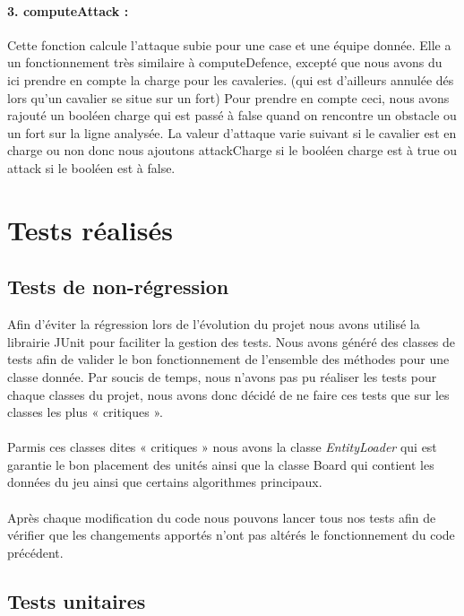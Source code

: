 			\paragraph{3. computeAttack : }
			Cette fonction calcule l'attaque subie pour une case et une équipe donnée.
			Elle a un fonctionnement très similaire à computeDefence, excepté que nous avons du ici prendre en compte la charge pour les cavaleries. 
			(qui est d'ailleurs annulée dés lors qu'un cavalier se situe sur un fort)
			Pour prendre en compte ceci, nous avons rajouté un booléen charge qui est passé à false quand on rencontre un obstacle 
			ou un fort sur la ligne analysée.
			La valeur d'attaque varie suivant si le cavalier est en charge ou non donc nous ajoutons attackCharge si le booléen charge est 
			à true ou attack si le booléen est à false.
			
		\clearpage
	 

	\section{Tests réalisés}

		\subsection{Tests de non-régression}
		
		Afin d'éviter la régression lors de l'évolution du projet nous avons utilisé la librairie JUnit pour faciliter la gestion des tests. 
		Nous avons généré des classes de tests afin de valider le bon fonctionnement de l'ensemble des méthodes pour une classe donnée.
		Par soucis de temps, nous n'avons pas pu réaliser les tests pour chaque classes du projet, nous avons donc décidé de ne faire ces tests que sur les classes les plus « critiques ».\\ \\
		Parmis ces classes dites « critiques » nous avons la classe {\itshape EntityLoader} qui est garantie le bon placement des unités ainsi que la classe Board qui contient les données du jeu
		ainsi que certains algorithmes principaux.
		\\ \\
		Après chaque modification du code nous pouvons lancer tous nos tests afin de vérifier que les changements apportés n'ont pas altérés le fonctionnement du code précédent.
		
		\subsection{Tests unitaires}

